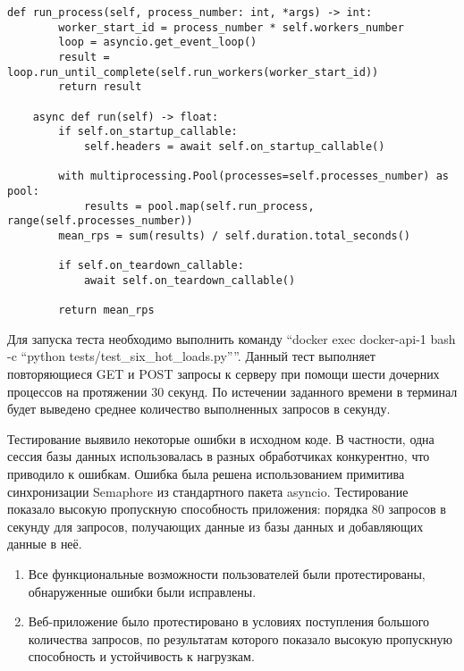 \begin{lstlisting}[caption={Функции запуска процессов класса HotLoad}, label={listing:hot_load_launch_functions}]
    def run_process(self, process_number: int, *args) -> int:
        worker_start_id = process_number * self.workers_number
        loop = asyncio.get_event_loop()
        result = loop.run_until_complete(self.run_workers(worker_start_id))
        return result

    async def run(self) -> float:
        if self.on_startup_callable:
            self.headers = await self.on_startup_callable()

        with multiprocessing.Pool(processes=self.processes_number) as pool:
            results = pool.map(self.run_process, range(self.processes_number))
        mean_rps = sum(results) / self.duration.total_seconds()

        if self.on_teardown_callable:
            await self.on_teardown_callable()

        return mean_rps
\end{lstlisting}

Для запуска теста необходимо выполнить команду “docker exec docker-api-1 bash -c “python tests/test\_six\_hot\_loads.py””. Данный тест выполняет повторяющиеся GET и POST запросы к серверу при помощи шести дочерних процессов на протяжении 30 секунд. По истечении заданного времени в терминал будет выведено среднее количество выполненных запросов в секунду.

Тестирование выявило некоторые ошибки в исходном коде. В частности, одна сессия базы данных использовалась в разных обработчиках конкурентно, что приводило к ошибкам. Ошибка была решена использованием примитива синхронизации Semaphore из стандартного пакета asyncio. Тестирование показало высокую пропускную способность приложения: порядка 80 запросов в секунду для запросов, получающих данные из базы данных и добавляющих данные в неё.


\begin{enumerate}
    \item Все функциональные возможности пользователей были протестированы, обнаруженные ошибки были исправлены.
    \item Веб-приложение было протестировано в условиях поступления большого количества запросов, по результатам которого показало высокую пропускную способность и устойчивость к нагрузкам.
\end{enumerate}
